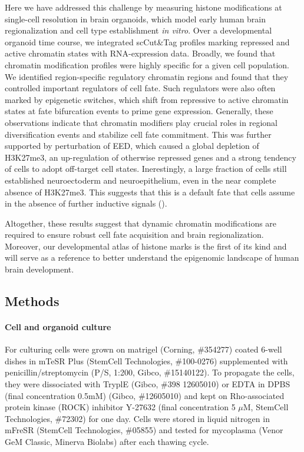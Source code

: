 Here we have addressed this challenge by measuring histone modifications at single-cell resolution in brain organoids, which model early human brain regionalization and cell type establishment \textit{in vitro}. Over a developmental organoid time course, we integrated scCut\&Tag profiles marking repressed and active chromatin states with RNA-expression data. Broadly, we found that chromatin modification profiles were highly specific for a given cell population. We identified region-specific regulatory chromatin regions and found that they controlled important regulators of cell fate. Such regulators were also often marked by epigenetic switches, which shift from repressive to active chromatin states at fate bifurcation events to prime gene expression. Generally, these observations indicate that chromatin modifiers play crucial roles in regional diversification events and stabilize cell fate commitment. This was further supported by perturbation of EED, which caused a global depletion of H3K27me3, an up-regulation of otherwise repressed genes and a strong tendency of cells to adopt off-target cell states. Inerestingly, a large fraction of cells still established neuroectoderm and neuroepithelium, even in the near complete absence of H3K27me3. This suggests that this is a default fate that cells assume in the absence of further inductive signals (\cite{argelaguet_multi-omics_2019,munoz-sanjuan_neural_2002}).  

Altogether, these results suggest that dynamic chromatin modifications are required to ensure robust cell fate acquisition and brain regionalization. Moreover, our developmental atlas of histone marks is the first of its kind and will serve as a reference to better understand the epigenomic landscape of human brain development.




\subsection{Methods}

\paragraph{Cell and organoid culture}
For culturing cells were grown on matrigel (Corning, \#354277) coated 6-well dishes in mTeSR Plus (StemCell Technologies, \#100-0276) supplemented with penicillin/streptomycin (P/S, 1:200, Gibco, \#15140122). To propagate the cells, they were dissociated with TryplE (Gibco, \#398 12605010) or EDTA in DPBS (final concentration 0.5mM) (Gibco, \#12605010) and kept on Rho-associated protein kinase (ROCK) inhibitor Y-27632 (final concentration 5 $\mu$M, StemCell Technologies, \#72302) for one day. Cells were stored in liquid nitrogen in mFreSR (StemCell Technologies, \#05855) and tested for mycoplasma (Venor GeM Classic, Minerva Biolabs) after each thawing cycle. 

